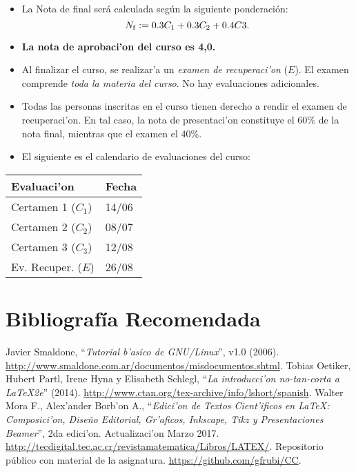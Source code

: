 \documentclass[letterpaper,11pt]{exam}
\begin{document}
\begin{multicols}{2}
\begin{itemize}
\item La Nota de final ser\'a calculada seg\'un la siguiente ponderaci\'on:
{\small
\begin{equation}
N_{\rm f} :=0.3C_1+0.3C_2 + 0.4C3.
\end{equation}
}
\item \textbf{La nota de aprobaci'on del curso es 4,0.}
\item Al finalizar el curso, se realizar'a un \textit{examen de recuperaci'on} ($E$). El examen comprende \textit{toda la materia del curso}. No hay evaluaciones adicionales.
\item Todas las personas inscritas en el curso tienen derecho a rendir el examen de recuperaci'on. En tal caso, la nota de presentaci'on constituye el 60\% de la nota final, mientras que el examen el 40\%.

\item El siguiente es el calendario de evaluaciones del curso:
\end{itemize} 
\begin{center}
\begin{scriptsize}
\begin{tabular}{|ll|}
\hline 
Evaluaci'on &  Fecha\\
\hline
Certamen 1 ($C_1$) & 14/06 \\ 
Certamen 2 ($C_2$) & 08/07 \\ 
Certamen 3 ($C_3$) & 12/08\\ 
Ev. Recuper. ($E$) & 26/08 \\ 
\hline 
\end{tabular} 
\end{scriptsize}
\end{center}

\section{Bibliografía Recomendada}

\begin{thebibliography}{77}	%
\small
{} Javier Smaldone, ``\textit{Tutorial b'asico de GNU/Linux}'',  v1.0 (2006).
\url{http://www.smaldone.com.ar/documentos/misdocumentos.shtml}.
 Tobias Oetiker, Hubert Partl, Irene Hyna y Elisabeth Schlegl, ``\textit{La introducci'on no-tan-corta a \LaTeX 2e}'' (2014). \url{http://www.ctan.org/tex-archive/info/lshort/spanish}.
 Walter Mora F., Alex'ander Borb'on A., ``\textit{Edici'on de Textos Cient'ificos en \LaTeX: Composici'on, Dise\~no Editorial, Gr'aficos, Inkscape, Tikz y Presentaciones Beamer}'', 2da edici'on. Actualizaci'on Marzo 2017. \url{http://tecdigital.tec.ac.cr/revistamatematica/Libros/LATEX/}.
 Repositorio p\'ublico con material de la asignatura. \url{https://github.com/gfrubi/CC}.
\end{thebibliography}	


\end{multicols}
\end{document}
